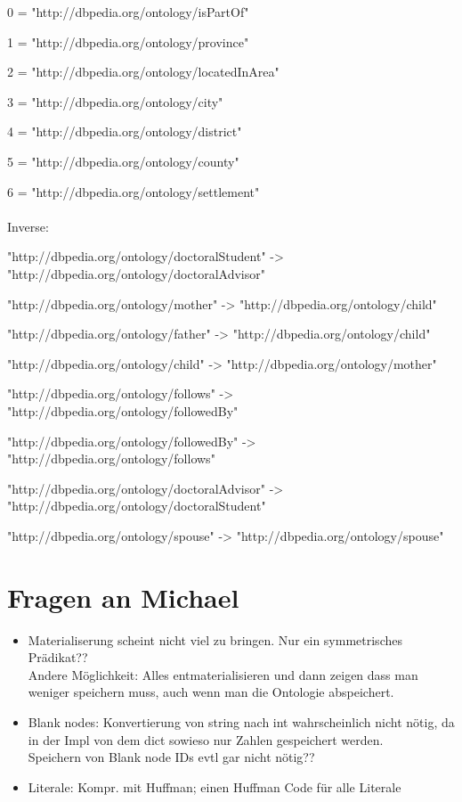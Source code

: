 \documentclass[a4paper]{scrartcl}
\begin{document}
0 = "http://dbpedia.org/ontology/isPartOf"

1 = "http://dbpedia.org/ontology/province"

2 = "http://dbpedia.org/ontology/locatedInArea"

3 = "http://dbpedia.org/ontology/city"

4 = "http://dbpedia.org/ontology/district"

5 = "http://dbpedia.org/ontology/county"

6 = "http://dbpedia.org/ontology/settlement"
\\\\
Inverse:

"http://dbpedia.org/ontology/doctoralStudent" -> "http://dbpedia.org/ontology/doctoralAdvisor"

"http://dbpedia.org/ontology/mother" -> "http://dbpedia.org/ontology/child"

"http://dbpedia.org/ontology/father" -> "http://dbpedia.org/ontology/child"

 "http://dbpedia.org/ontology/child" -> "http://dbpedia.org/ontology/mother"
 
 "http://dbpedia.org/ontology/follows" -> "http://dbpedia.org/ontology/followedBy"
 
 "http://dbpedia.org/ontology/followedBy" -> "http://dbpedia.org/ontology/follows"
 
 "http://dbpedia.org/ontology/doctoralAdvisor" -> "http://dbpedia.org/ontology/doctoralStudent"
 
 "http://dbpedia.org/ontology/spouse" -> "http://dbpedia.org/ontology/spouse"



\section{Fragen an Michael}

\begin{itemize}
	\item Materialiserung scheint nicht viel zu bringen. Nur ein symmetrisches Prädikat?? \\
	Andere Möglichkeit: Alles entmaterialisieren und dann zeigen dass man weniger speichern muss, auch wenn man die Ontologie abspeichert. 
	\item Blank nodes: Konvertierung von string nach int wahrscheinlich nicht nötig, da in der Impl von dem dict sowieso nur Zahlen gespeichert werden.\\
	Speichern von Blank node IDs evtl gar nicht nötig??
	\item Literale: Kompr. mit Huffman; einen Huffman Code für alle Literale
\end{itemize}
\end{document}

